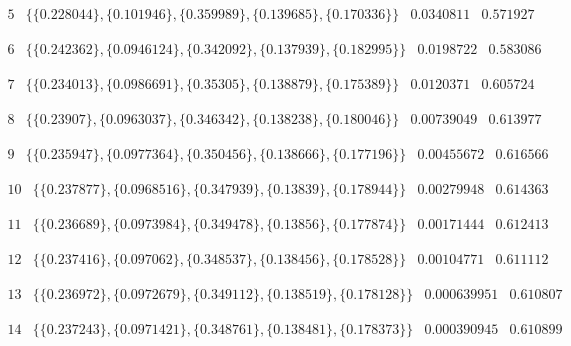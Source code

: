 \documentclass{article}
\begin{document}
\noindent\(
\begin{array}{cccc}
 5 & \{\{0.228044\},\{0.101946\},\{0.359989\},\{0.139685\},\{0.170336\}\} & 0.0340811 & 0.571927
\end{array}
\)

\noindent\(
\begin{array}{cccc}
 6 & \{\{0.242362\},\{0.0946124\},\{0.342092\},\{0.137939\},\{0.182995\}\} & 0.0198722 & 0.583086
\end{array}
\)

\noindent\(
\begin{array}{cccc}
 7 & \{\{0.234013\},\{0.0986691\},\{0.35305\},\{0.138879\},\{0.175389\}\} & 0.0120371 & 0.605724
\end{array}
\)

\noindent\(
\begin{array}{cccc}
 8 & \{\{0.23907\},\{0.0963037\},\{0.346342\},\{0.138238\},\{0.180046\}\} & 0.00739049 & 0.613977
\end{array}
\)

\noindent\(
\begin{array}{cccc}
 9 & \{\{0.235947\},\{0.0977364\},\{0.350456\},\{0.138666\},\{0.177196\}\} & 0.00455672 & 0.616566
\end{array}
\)

\noindent\(
\begin{array}{cccc}
 10 & \{\{0.237877\},\{0.0968516\},\{0.347939\},\{0.13839\},\{0.178944\}\} & 0.00279948 & 0.614363
\end{array}
\)

\noindent\(
\begin{array}{cccc}
 11 & \{\{0.236689\},\{0.0973984\},\{0.349478\},\{0.13856\},\{0.177874\}\} & 0.00171444 & 0.612413
\end{array}
\)

\noindent\(
\begin{array}{cccc}
 12 & \{\{0.237416\},\{0.097062\},\{0.348537\},\{0.138456\},\{0.178528\}\} & 0.00104771 & 0.611112
\end{array}
\)

\noindent\(
\begin{array}{cccc}
 13 & \{\{0.236972\},\{0.0972679\},\{0.349112\},\{0.138519\},\{0.178128\}\} & 0.000639951 & 0.610807
\end{array}
\)

\noindent\(
\begin{array}{cccc}
 14 & \{\{0.237243\},\{0.0971421\},\{0.348761\},\{0.138481\},\{0.178373\}\} & 0.000390945 & 0.610899
\end{array}
\)
\end{document}

